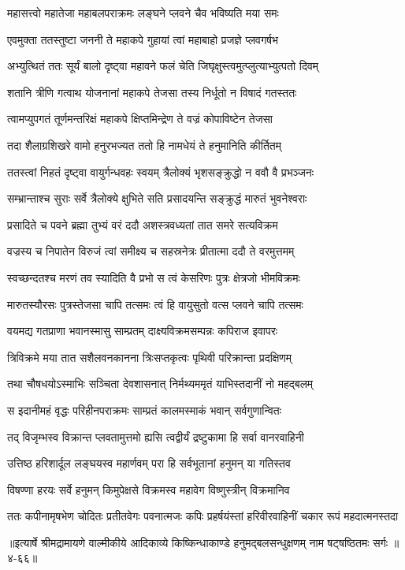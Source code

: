 \twolineshloka
{महासत्त्वो महातेजा महाबलपराक्रमः}
{लङ्घने प्लवने चैव भविष्यति मया समः} %

\twolineshloka
{एवमुक्ता ततस्तुष्टा जननी ते महाकपे}
{गुहायां त्वां महाबाहो प्रजज्ञे प्लवगर्षभ} %

\twolineshloka
{अभ्युत्थितं ततः सूर्यं बालो दृष्ट्वा महावने}
{फलं चेति जिघृक्षुस्त्वमुत्प्लुत्याभ्युत्पतो दिवम्} %

\twolineshloka
{शतानि त्रीणि गत्वाथ योजनानां महाकपे}
{तेजसा तस्य निर्धूतो न विषादं गतस्ततः} %

\twolineshloka
{त्वामप्युपगतं तूर्णमन्तरिक्षं महाकपे}
{क्षिप्तमिन्द्रेण ते वज्रं कोपाविष्टेन तेजसा} %

\twolineshloka
{तदा शैलाग्रशिखरे वामो हनुरभज्यत}
{ततो हि नामधेयं ते हनुमानिति कीर्तितम्} %

\twolineshloka
{ततस्त्वां निहतं दृष्ट्वा वायुर्गन्धवहः स्वयम्}
{त्रैलोक्यं भृशसङ्क्रुद्धो न ववौ वै प्रभञ्जनः} %

\twolineshloka
{सम्भ्रान्ताश्च सुराः सर्वे त्रैलोक्ये क्षुभिते सति}
{प्रसादयन्ति सङ्क्रुद्धं मारुतं भुवनेश्वराः} %

\twolineshloka
{प्रसादिते च पवने ब्रह्मा तुभ्यं वरं ददौ}
{अशस्त्रवध्यतां तात समरे सत्यविक्रम} %

\twolineshloka
{वज्रस्य च निपातेन विरुजं त्वां समीक्ष्य च}
{सहस्रनेत्रः प्रीतात्मा ददौ ते वरमुत्तमम्} %

\twolineshloka
{स्वच्छन्दतश्च मरणं तव स्यादिति वै प्रभो}
{स त्वं केसरिणः पुत्रः क्षेत्रजो भीमविक्रमः} %

\twolineshloka
{मारुतस्यौरसः पुत्रस्तेजसा चापि तत्समः}
{त्वं हि वायुसुतो वत्स प्लवने चापि तत्समः} %

\twolineshloka
{वयमद्य गतप्राणा भवानस्मासु साम्प्रतम्}
{दाक्ष्यविक्रमसम्पन्नः कपिराज इवापरः} %

\twolineshloka
{त्रिविक्रमे मया तात सशैलवनकानना}
{त्रिःसप्तकृत्वः पृथिवी परिक्रान्ता प्रदक्षिणम्} %

\twolineshloka
{तथा चौषधयोऽस्माभिः सञ्चिता देवशासनात्}
{निर्मथ्यममृतं याभिस्तदानीं नो महद्बलम्} %

\twolineshloka
{स इदानीमहं वृद्धः परिहीनपराक्रमः}
{साम्प्रतं कालमस्माकं भवान् सर्वगुणान्वितः} %

\twolineshloka
{तद् विजृम्भस्व विक्रान्त प्लवतामुत्तमो ह्यसि}
{त्वद्वीर्यं द्रष्टुकामा हि सर्वा वानरवाहिनी} %

\twolineshloka
{उत्तिष्ठ हरिशार्दूल लङ्घयस्व महार्णवम्}
{परा हि सर्वभूतानां हनुमन् या गतिस्तव} %

\twolineshloka
{विषण्णा हरयः सर्वे हनुमन् किमुपेक्षसे}
{विक्रमस्व महावेग विष्णुस्त्रीन् विक्रमानिव} %

\twolineshloka
{ततः कपीनामृषभेण चोदितः प्रतीतवेगः पवनात्मजः कपिः}
{प्रहर्षयंस्तां हरिवीरवाहिनीं चकार रूपं महदात्मनस्तदा} %


॥इत्यार्षे श्रीमद्रामायणे वाल्मीकीये आदिकाव्ये किष्किन्धाकाण्डे हनुमद्बलसन्धुक्षणम् नाम षट्षष्ठितमः सर्गः ॥४-६६॥

